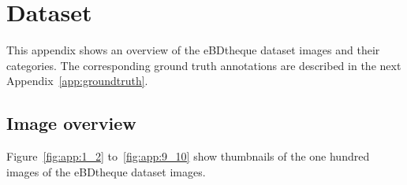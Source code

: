\chapter{Dataset}
\label{app:dataset}
\graphicspath{{./chapters/Appendix/figs/}}

This appendix shows an overview of the eBDtheque dataset images and their categories.
The corresponding ground truth annotations are described in the next Appendix~\ref{app:groundtruth}.

\section{Image overview} %
\label{sec:image_overview}

Figure~\ref{fig:app:1_2} to~\ref{fig:app:9_10} show thumbnails of the one hundred images of the eBDtheque dataset images.


